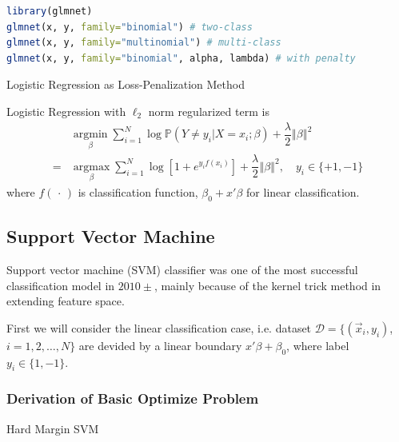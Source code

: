 \begin{rcode}
\begin{lstlisting}[language=R]
library(glmnet)
glmnet(x, y, family="binomial") # two-class 
glmnet(x, y, family="multinomial") # multi-class
glmnet(x, y, family="binomial", alpha, lambda) # with penalty
\end{lstlisting}
\end{rcode}

\begin{point}
    Logistic Regression as Loss-Penalization Method
\end{point}

    Logistic Regression with $ \ell_2 $ norm regularized term is
    \begin{align}
         &\mathop{\arg\min}\limits_{\beta }\sum_{i=1}^N\log \mathbb{P}\left( Y\neq y_i|X=x_i;\beta  \right)+\dfrac{\lambda }{2}\left\Vert \beta  \right\Vert ^2\\
         =&\mathop{\arg\max}\limits_{\beta }\sum_{i=1}^N\log [1+e^{y_if(x_i)}]+\dfrac{\lambda }{2}\left\Vert \beta  \right\Vert ^2   ,\quad y_i\in\{+1,-1\}    
    \end{align}
    where $ f(\,\cdot\,) $ is classification function, $ \beta _0+x'\beta  $ for linear classification. 
    
    



    



\subsection{Support Vector Machine}
    Support vector machine (SVM) classifier was one of the most successful classification model in $ 2010\pm $, mainly because of the kernel trick method in extending feature space.

    First we will consider the linear classification case, i.e. dataset $\mathcal{D}=\{ (\vec{x}_i,y_i) $, $ i=1,2,\ldots,N \}$ are devided by a linear boundary $ x'\beta +\beta _0 $, where label $ y_i\in\{1,-1\} $.

\subsubsection{Derivation of Basic Optimize Problem}
\begin{point}
    Hard Margin SVM
\end{point}


